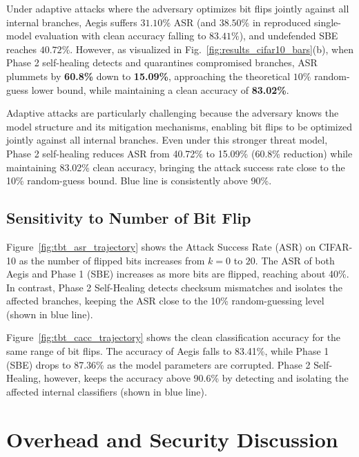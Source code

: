 \documentclass[conference,10pt]{IEEEtran}
\begin{document}
Under adaptive attacks where the adversary optimizes bit flips jointly against all internal branches, Aegis suffers $31.10\%$ ASR (and $38.50\%$ in reproduced single-model evaluation with clean accuracy falling to $83.41\%$), and undefended SBE reaches $40.72\%$. However, as visualized in Fig.~\ref{fig:results_cifar10_bars}(b), when Phase 2 self-healing detects and quarantines compromised branches, ASR plummets by \textbf{60.8\%} down to \textbf{15.09\%}, approaching the theoretical $10\%$ random-guess lower bound, while maintaining a clean accuracy of \textbf{83.02\%}.

Adaptive attacks are particularly challenging because the adversary knows the model structure and its mitigation mechanisms, enabling bit flips to be optimized jointly against all internal branches. Even under this stronger threat model, Phase 2 self-healing reduces ASR from 40.72\% to 15.09\% (60.8\% reduction) while maintaining 83.02\% clean accuracy, bringing the attack success rate close to the 10\% random-guess bound. Blue line is consistently above 90\%.

\subsection{Sensitivity to Number of Bit Flip}

Figure~\ref{fig:tbt_asr_trajectory} shows the Attack Success Rate (ASR) on CIFAR-10 as the number of flipped bits increases from $k=0$ to $20$. The ASR of both Aegis and Phase 1 (SBE) increases as more bits are flipped, reaching about 40\%. In contrast, Phase 2 Self-Healing detects checksum mismatches and isolates the affected branches, keeping the ASR close to the 10\% random-guessing level (shown in blue line).

Figure~\ref{fig:tbt_cacc_trajectory} shows the clean classification accuracy for the same range of bit flips. The accuracy of Aegis falls to 83.41\%, while Phase 1 (SBE) drops to 87.36\% as the model parameters are corrupted. Phase 2 Self-Healing, however, keeps the accuracy above 90.6\% by detecting and isolating the affected internal classifiers (shown in blue line).

\section{Overhead and Security Discussion}
\end{document}
